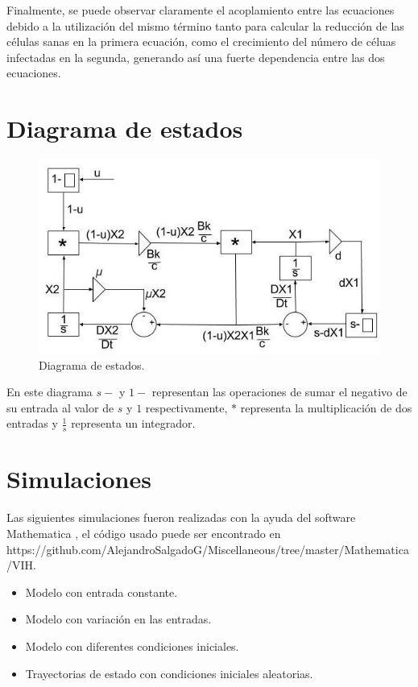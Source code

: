 \documentclass{article}
\begin{document}
    Finalmente, se puede observar claramente el acoplamiento entre las ecuaciones
    debido a la utilización del mismo término tanto para calcular la reducción de las
    células sanas en la primera ecuación, como el crecimiento del número
    de céluas infectadas en la segunda, generando así una fuerte dependencia entre
    las dos ecuaciones.

\newpage

\section{Diagrama de estados}

\begin{figure}[h!]
    \centering
    \includegraphics[width=\textwidth]{Images/State-diagram.jpeg}
    \caption{Diagrama de estados.}
    \label{fig:state-diagram}
\end{figure}

En este diagrama $s -$ y $1-$ representan las operaciones de sumar el negativo
de su entrada al valor de $s$ y $1$ respectivamente, $*$ representa la
multiplicación de dos entradas y $\frac{1}{s}$ representa un integrador.

\section{Simulaciones}

Las siguientes simulaciones fueron realizadas con la ayuda del software Mathematica
\cite{mathematica}, el código usado puede ser encontrado en
https://github.com/AlejandroSalgadoG/Miscellaneous/tree/master/Mathematica/VIH.

\begin{itemize}
    \item Modelo con entrada constante.
    \item Modelo con variación en las entradas.
    \item Modelo con diferentes condiciones iniciales.
    \item Trayectorias de estado con condiciones iniciales aleatorias.
\end{itemize}
\end{document}
